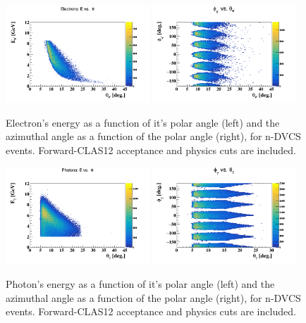 \begin{figure}[htb]
\centering
   \includegraphics[width=0.48\textwidth,clip,trim=0mm 0mm 0mm 
   20mm]{figs/e_E_theta.png}
\includegraphics[width=0.48\textwidth,clip,trim=0mm 0mm 0mm 
   20mm]{figs/e_phi_theta.png}
   \caption{Electron's energy as a function of it's polar angle (left) and the 
   azimuthal angle as a function of the polar angle (right), for n-DVCS events.  
   Forward-CLAS12 acceptance and physics cuts are included.}
   \label{fig:el_kin}
\end{figure}
 
\begin{figure}[htb]
\centering
   \includegraphics[width=0.48\textwidth,clip,trim=0mm 0mm 0mm 
   20mm]{figs/gamma_E_theta.png}
\includegraphics[width=0.48\textwidth,clip,trim=0mm 0mm 0mm 
   20mm]{figs/gamma_phi_theta.png}
   \caption{Photon's energy as a function of it's polar angle (left) and the 
   azimuthal angle as a function of the polar angle (right), for n-DVCS events.  
   Forward-CLAS12 acceptance and physics cuts are included.}
   \label{fig:photon_kin}
\end{figure}
 
